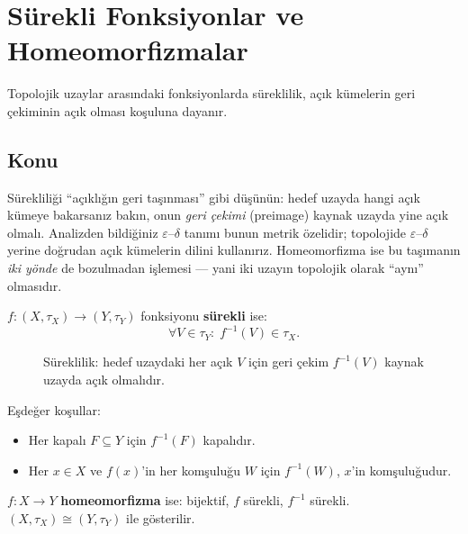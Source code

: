 \chapter{Sürekli Fonksiyonlar ve Homeomorfizmalar}

Topolojik uzaylar arasındaki fonksiyonlarda süreklilik, açık kümelerin
geri çekiminin açık olması koşuluna dayanır.

\section{Konu}

\begin{sezgi}
Sürekliliği ``açıklığın geri taşınması'' gibi düşünün: hedef uzayda hangi
açık kümeye bakarsanız bakın, onun \emph{geri çekimi} (preimage) kaynak
uzayda yine açık olmalı. Analizden bildiğiniz $\varepsilon$--$\delta$ tanımı
bunun metrik özelidir; topolojide $\varepsilon$--$\delta$ yerine doğrudan
açık kümelerin dilini kullanırız. Homeomorfizma ise bu taşımanın \emph{iki
yönde} de bozulmadan işlemesi --- yani iki uzayın topolojik olarak ``aynı''
olmasıdır.
\end{sezgi}

\begin{definition}
$f: (X, \tau_X) \to (Y, \tau_Y)$ fonksiyonu \textbf{sürekli} ise:
\[
\forall V \in \tau_Y:\; f^{-1}(V) \in \tau_X.
\]
\end{definition}

\begin{figure}[ht]
  \centering
  
  \caption{Süreklilik: hedef uzaydaki her açık $V$ için geri çekim
    $f^{-1}(V)$ kaynak uzayda açık olmalıdır.}
  \label{fig:ch10:sureklilik}
\end{figure}

Eşdeğer koşullar:
\begin{itemize}
  \item Her kapalı $F \subseteq Y$ için $f^{-1}(F)$ kapalıdır.
  \item Her $x \in X$ ve $f(x)$'in her komşuluğu $W$ için $f^{-1}(W)$, $x$'in komşuluğudur.
\end{itemize}

\begin{definition}[Homeomorfizma]
$f: X \to Y$ \textbf{homeomorfizma} ise: bijektif, $f$ sürekli, $f^{-1}$ sürekli.
$(X, \tau_X) \cong (Y, \tau_Y)$ ile gösterilir.
\end{definition}

